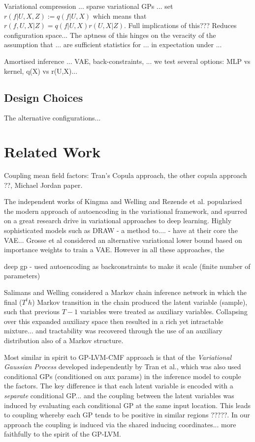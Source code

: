 \documentclass[]{article}
\newcommand{\f}{f}
\begin{document}
Variational compression ... sparse variational GPs ... set $r(\f|U,X,Z):=q(\f|U,X)$ which means that $r(\f,U,X|Z) = q(\f|U,X)r(U,X|Z)$.
Full implications of this??? Reduces configuration space...
The aptness of this hinges on the veracity of the assumption that ... are sufficient statistics for ... in expectation under ...

Amortised inference ... VAE, back-constraints, ... we test several options: MLP vs kernel, q(X) vs r(U,X)...

\subsection{Design Choices}\label{subsec:choices}

The alternative configurations...

\section{Related Work}\label{sec:related}

Coupling mean field factors: Tran's Copula approach, the other copula approach ??, Michael Jordan paper.

The independent works of Kingma and Welling and Rezende et al. popularised the modern approach of autoencoding in the variational framework, and spurred on a great research drive in variational approaches to deep learning.
Highly sophisticated models such as DRAW - a method to.... - have at their core the VAE... Grosse et al considered an alternative variational lower bound based on importance weights to train a VAE.
However in all these approaches, the

deep gp - used autoencoding as backconstraints to make it scale (finite number of parameters)

Salimans and Welling considered a Markov chain inference network in which the final ($T^th$) Markov transition in the chain produced the latent variable (sample), such that previous $T-1$ variables were treated as auxiliary variables.
Collapsing over this expanded auxiliary space then resulted in a rich yet intractable mixture... and tractability was recovered through the use of an auxiliary distribution also of a Markov structure.

Most similar in spirit to GP-LVM-CMF approach is that of the \emph{Variational Gaussian Process} developed independently by Tran et al., which was also used conditional GPs (conditioned on aux params) in the inference model to couple the factors.
The key difference is that each latent variable is encoded with a \emph{separate} conditional GP... and the coupling between the latent variables was induced by evaluating each conditional GP at the same input location.
This leads to coupling whereby each GP tends to be positive in similar regions ?????.
In our approach the coupling is induced via the shared inducing coordinates... more faithfully to the spirit of the GP-LVM.
\end{document}
